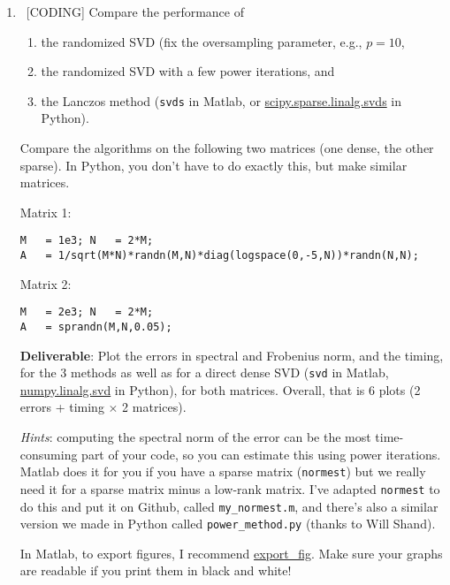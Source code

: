 \documentclass[10pt, letterpaper]{scrartcl}
\begin{document}
\begin{enumerate}[align=left, leftmargin=*, label=\sffamily\bfseries Problem \arabic*:]   
 
    \item \ [CODING] Compare the performance of 
    \begin{enumerate}[noitemsep]
\item the randomized SVD (fix the oversampling parameter, e.g., $p=10$, 
\item the randomized SVD with a few power iterations, and 
\item the Lanczos method (\texttt{svds} in Matlab, or \href{https://docs.scipy.org/doc/scipy/reference/generated/scipy.sparse.linalg.svds.html}{scipy.sparse.linalg.svds} in Python).
    \end{enumerate}
    
    Compare the algorithms on the following two matrices (one dense, the other sparse). In Python, you don't have to do exactly this, but make similar matrices.
    
    Matrix 1:
\begin{lstlisting}
M   = 1e3; N   = 2*M;
A   = 1/sqrt(M*N)*randn(M,N)*diag(logspace(0,-5,N))*randn(N,N);
\end{lstlisting}

    Matrix 2:
\begin{lstlisting}
M   = 2e3; N   = 2*M;
A   = sprandn(M,N,0.05);
\end{lstlisting}
    
    \textbf{Deliverable}: Plot the errors in spectral and Frobenius norm, and the timing, for the 3 methods as well as for a direct dense SVD (\texttt{svd} in Matlab, \href{https://docs.scipy.org/doc/numpy/reference/generated/numpy.linalg.svd.html}{numpy.linalg.svd} in Python), for both matrices.  Overall, that is 6 plots (2 errors + timing $\times$ 2 matrices).
    
    \emph{Hints}: computing the spectral norm of the error can be the most time-consuming part of your code, so you can estimate this using power iterations. Matlab does it for you if you have a sparse matrix (\texttt{normest}) but we really need it for a sparse matrix minus a low-rank matrix. I've adapted \texttt{normest} to do this and put it on Github, called \texttt{my\_normest.m}, and there's also a similar version we made in Python called \texttt{power\_method.py} (thanks to Will Shand).
    
    
    In Matlab, to export figures, I recommend \href{https://www.mathworks.com/matlabcentral/fileexchange/23629-export_fig}{export\_fig}. Make sure your graphs are readable if you print them in black and white!


\end{enumerate}
\end{document}
